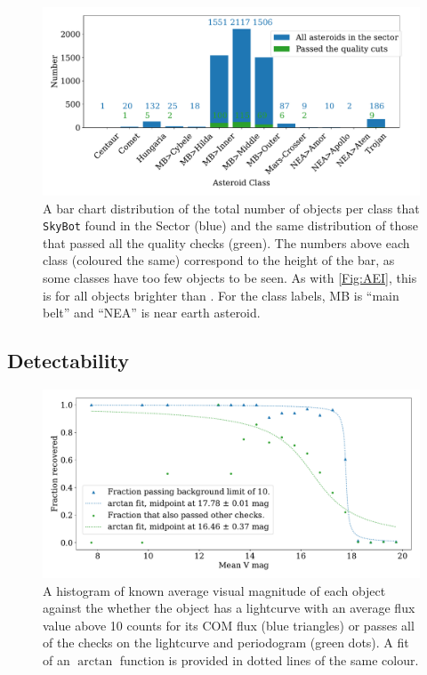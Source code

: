 \documentclass{UCreport}
\begin{document}
\begin{figure}
  \centering
  \includegraphics[width=\textwidth]{../OzData/classesBarqualCut.pdf}
  \caption[Class distribution]{A bar chart distribution of the total number of objects per class that \texttt{SkyBot} found in the Sector (blue) and the same distribution of those that passed all the quality checks (green). 
  The numbers above each class (coloured the same) correspond to the height of the bar, as some classes have too few objects to be seen.
  As with \autoref{Fig:AEI}, this is for all objects brighter than \unit{\mag}.
  For the class labels, MB is ``main belt'' and ``NEA'' is near earth asteroid.}
  \label{Fig:NumPerClass}
\end{figure}

\subsection{Detectability}

\begin{figure}
  \centering
  \includegraphics[width=\textwidth]{../OzData/recoverdHistBkgLimof10AtanBothLegendFixed.pdf}
  \caption[Recovery plot]{A histogram of known average visual magnitude of each object against the whether the object has a lightcurve with an average flux value above 10 %
  counts for its COM flux (blue triangles) or passes all of the checks on the lightcurve and periodogram (green dots).
  A fit of an $\arctan$ function is provided in dotted lines of the same colour. 
  }
  \label{Fig:RecovPassorFail}
\end{figure}
\end{document}
